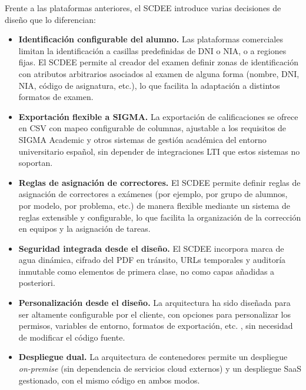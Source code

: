 Frente a las plataformas anteriores, el SCDEE introduce varias decisiones
de diseño que lo diferencian:

\begin{itemize}
  \item \textbf{Identificación configurable del alumno.} Las plataformas
  comerciales limitan la identificación a casillas predefinidas de DNI o
  NIA, o a regiones fijas. El SCDEE permite al creador del examen definir
  zonas de identificación con atributos arbitrarios asociados al examen de
  alguna forma (nombre, DNI, NIA, código de asignatura, etc.), lo que facilita
  la adaptación a distintos formatos de examen.

  \item \textbf{Exportación flexible a SIGMA.} La exportación de
  calificaciones se ofrece en CSV con mapeo configurable de columnas,
  ajustable a los requisitos de SIGMA Academic y otros sistemas de
  gestión académica del entorno universitario español, sin depender de
  integraciones LTI que estos sistemas no soportan.

  \item \textbf{Reglas de asignación de correctores.} El SCDEE permite definir
  reglas de asignación de correctores a exámenes (por ejemplo, por grupo
  de alumnos, por modelo, por problema, etc.) de manera flexible mediante un
  sistema de reglas extensible y configurable, lo que facilita la
  organización de la corrección en equipos y la asignación de tareas.

  \item \textbf{Seguridad integrada desde el diseño.} El SCDEE incorpora
  marca de agua dinámica, cifrado del PDF en tránsito, URLs temporales y
  auditoría inmutable como elementos de primera clase, no como capas
  añadidas a posteriori.

  \item \textbf{Personalización desde el diseño.} La arquitectura ha sido
  diseñada para ser altamente configurable por el cliente, con opciones para
  personalizar los permisos, variables de entorno, formatos de exportación, etc.
  , sin necesidad de modificar el código fuente.

  \item \textbf{Despliegue dual.} La arquitectura de contenedores permite
  un despliegue \textit{on-premise} (sin dependencia de servicios cloud
  externos) y un despliegue SaaS gestionado, con el mismo código en ambos
  modos.
\end{itemize}

